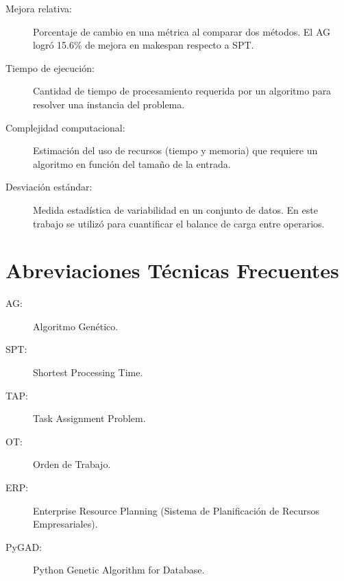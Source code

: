 \begin{description}
    
    \item[Mejora relativa:] Porcentaje de cambio en una métrica al comparar dos métodos. El AG logró 15.6\% de mejora en makespan respecto a SPT.
    
    \item[Tiempo de ejecución:] Cantidad de tiempo de procesamiento requerida por un algoritmo para resolver una instancia del problema.
    
    \item[Complejidad computacional:] Estimación del uso de recursos (tiempo y memoria) que requiere un algoritmo en función del tamaño de la entrada.
    
    \item[Desviación estándar:] Medida estadística de variabilidad en un conjunto de datos. En este trabajo se utilizó para cuantificar el balance de carga entre operarios.
\end{description}

\section*{Abreviaciones Técnicas Frecuentes}

\begin{description}
    \item[AG:] Algoritmo Genético.
    
    \item[SPT:] Shortest Processing Time.
    
    \item[TAP:] Task Assignment Problem.
    
    \item[OT:] Orden de Trabajo.
    
    \item[ERP:] Enterprise Resource Planning (Sistema de Planificación de Recursos Empresariales).
    
    \item[PyGAD:] Python Genetic Algorithm for Database.
\end{description}